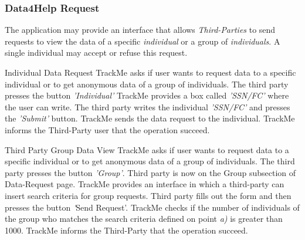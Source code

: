 \documentclass[a4paper]{article}
\begin{document}
        \subsubsection{Data4Help Request}
        The application may provide an interface that allows \textit{Third-Parties} to send requests to view the data of a specific \textit{individual} or a group of \textit{individuals}. A single individual may accept or refuse this request.
        
        \begin{usecase}{Individual Data Request}
              {TrackMe asks if user wants to request data to a specific individual or to get anonymous data of a group of individuals.}
              {The third party presses the button \textit{'Individual'} }
              {TrackMe provides a box called \textit{'SSN/FC'} where the user can write.}
              {The third party writes the individual \textit{'SSN/FC'} and presses the \textit{'Submit'} button.}
              {TrackMe sends the data request to the individual.}
              {TrackMe informs the Third-Party user that the operation succeed.}
        \end{usecase}
        
        \begin{usecase}{Third Party Group Data View}
              {TrackMe asks if user wants to request data to a specific individual or to get anonymous data of a group of individuals.}
              {The third party presses the button \textit{'Group'}. Third party is now on the Group subsection of Data-Request page.}
              {TrackMe provides an interface in which a third-party can insert search criteria for group requests.}
        {Third party fills out the form and then presses the button \textit'Send Request'.}
        {TrackMe checks if the number of individuals of the group who matches the search criteria defined on point \textit{a)} is greater than 1000.}
        {TrackMe informs the Third-Party that the operation succeed.}
        \end{usecase}
        
\end{document}
